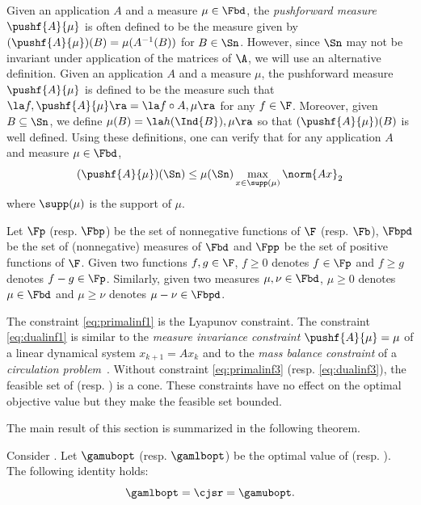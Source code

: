 Given an application $A$ and a measure $\mu \in \Fbd$,
the \emph{pushforward measure} $\pushf{A}{\mu}$ is often defined to be the measure given by
$(\pushf{A}{\mu})(B) = \mu(A^{-1}(B))$ for $B \in \Sn$.
However, since $\Sn$ may not be invariant under application of the matrices of $\A$,
we will use an alternative definition.
Given an application $A$ and a measure $\mu$,
the pushforward measure $\pushf{A}{\mu}$ is defined to be the measure such that
$\la f, \pushf{A}{\mu} \ra = \la f \circ A, \mu \ra$ for any $f \in \F$.
Moreover, given $B \subseteq \Sn$, we define $\mu(B) = \la h(\Ind{B}), \mu \ra$
so that $(\pushf{A}{\mu})(B)$ is well defined.
Using these definitions, one can verify that for any application $A$ and measure $\mu \in \Fbd$,
\begin{equation}
  \label{eq:pushfineq}
  (\pushf{A}{\mu})(\Sn) \leq \mu(\Sn)
  \max_{x \in \supp(\mu)} \norm{Ax}_2
\end{equation}
where $\supp(\mu)$ is the support of $\mu$.

Let $\Fp$ (resp. $\Fbp$) be the set of nonnegative functions of $\F$ (resp. $\Fb$),
$\Fbpd$ be the set of (nonnegative) measures of $\Fbd$
and $\Fpp$ be the set of positive functions of $\F$.
Given two functions $f, g \in \F$, $f \geq 0$ denotes $f \in \Fp$ and $f \geq g$ denotes $f - g \in \Fp$.
Similarly, given two measures $\mu, \nu \in \Fbd$, $\mu \geq 0$ denotes $\mu \in \Fbd$ and $\mu \geq \nu$ denotes $\mu - \nu \in \Fbpd$.





The constraint \eqref{eq:primalinf1} is the Lyapunov constraint.
The constraint \eqref{eq:dualinf1} is similar to the \emph{measure invariance constraint} $\pushf{A}{\mu} = \mu$ of a linear dynamical system $x_{k+1} = Ax_k$
and to the \emph{mass balance constraint} of a \emph{circulation problem}~\cite{ahuja1993network}.
Without constraint \eqref{eq:primalinf3} (resp. \eqref{eq:dualinf3}), the feasible set of  (resp. ) is a cone.
These constraints have no effect on the optimal objective value but they make the feasible set bounded.

The main result of this section is summarized in the following theorem.

\begin{theorem}
  \label{theo:exact}
  Consider .
    Let $\gamubopt$ (resp. $\gamlbopt$) be the optimal value of  (resp. ).
  The following identity holds:
  \[ \gamlbopt = \cjsr = \gamubopt. \]
\end{theorem}

